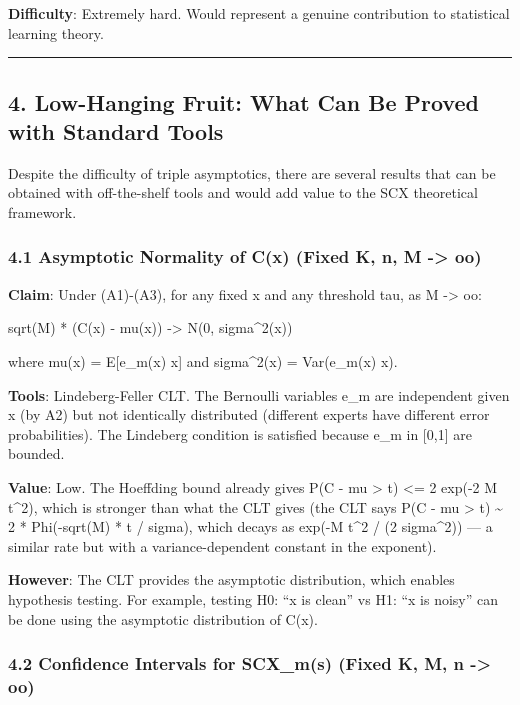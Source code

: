 \documentclass[
  12pt,
]{article}
\begin{document}
\textbf{Difficulty}: Extremely hard. Would represent a genuine
contribution to statistical learning theory.

\begin{center}\rule{0.5\linewidth}{0.5pt}\end{center}

\subsection{4. Low-Hanging Fruit: What Can Be Proved with Standard
Tools}\label{low-hanging-fruit-what-can-be-proved-with-standard-tools}

Despite the difficulty of triple asymptotics, there are several results
that can be obtained with off-the-shelf tools and would add value to the
SCX theoretical framework.

\subsubsection{4.1 Asymptotic Normality of C(x) (Fixed K, n, M
-\textgreater{} oo)}\label{asymptotic-normality-of-cx-fixed-k-n-m---oo}

\textbf{Claim}: Under (A1)-(A3), for any fixed x and any threshold tau,
as M -\textgreater{} oo:

sqrt(M) * (C(x) - mu(x)) -\textgreater{} N(0, sigma\^{}2(x))

where mu(x) = E{[}e\_m(x) \textbar{} x{]} and sigma\^{}2(x) =
Var(e\_m(x) \textbar{} x).

\textbf{Tools}: Lindeberg-Feller CLT. The Bernoulli variables e\_m are
independent given x (by A2) but not identically distributed (different
experts have different error probabilities). The Lindeberg condition is
satisfied because e\_m in {[}0,1{]} are bounded.

\textbf{Value}: Low. The Hoeffding bound already gives P(\textbar C -
mu\textbar{} \textgreater{} t) \textless= 2 exp(-2 M t\^{}2), which is
stronger than what the CLT gives (the CLT says P(\textbar C -
mu\textbar{} \textgreater{} t) \textasciitilde{} 2 * Phi(-sqrt(M) * t /
sigma), which decays as exp(-M t\^{}2 / (2 sigma\^{}2)) --- a similar
rate but with a variance-dependent constant in the exponent).

\textbf{However}: The CLT provides the asymptotic distribution, which
enables hypothesis testing. For example, testing H0: ``x is clean'' vs
H1: ``x is noisy'' can be done using the asymptotic distribution of
C(x).

\subsubsection{4.2 Confidence Intervals for SCX\_m(s) (Fixed K, M, n
-\textgreater{}
oo)}\label{confidence-intervals-for-scx_ms-fixed-k-m-n---oo}
\end{document}
